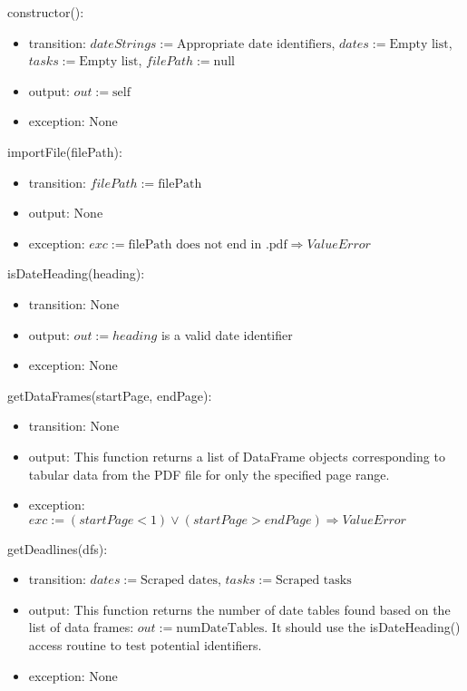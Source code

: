 \documentclass[12pt, titlepage]{article}
\begin{document}
\noindent constructor():
\begin{itemize}
\item transition: $\mathit{dateStrings} := \text{Appropriate date identifiers}$,
$\mathit{dates} := \text{Empty list}$, $\mathit{tasks} := \text{Empty list}$,
$\mathit{filePath} := \text{null}$
\item output: $out := \mbox{self}$
\item exception: None
\end{itemize}

\noindent importFile(filePath):
\begin{itemize}
\item transition: $\mathit{filePath} := \text{filePath}$
\item output: None
\item exception: $\mathit{exc} := \text{filePath does not end in .pdf} \Rightarrow \mathit{ValueError}$
\end{itemize}

\noindent isDateHeading(heading):
\begin{itemize}
\item transition: None 
\item output: $out := \mathit{heading}$ is a valid date identifier
\item exception: None
\end{itemize}

\noindent getDataFrames(startPage, endPage):
\begin{itemize}
\item transition: None 
\item output: This function returns a list of DataFrame objects corresponding to tabular data from the PDF
file for only the specified page range.
\item exception: $\mathit{exc} := (\mathit{startPage} < 1) \lor (\mathit{startPage} > \mathit{endPage}) \Rightarrow \mathit{ValueError}$
\end{itemize}

\noindent getDeadlines(dfs):
\begin{itemize}
\item transition: $\mathit{dates} := \text{Scraped dates}$, $\mathit{tasks} := \text{Scraped tasks}$
\item output: This function returns the number of date tables found based on the list of data frames:
$out := \text{numDateTables}$. It should use the isDateHeading() access routine to test potential identifiers.
\item exception: None
\end{itemize}
\end{document}

